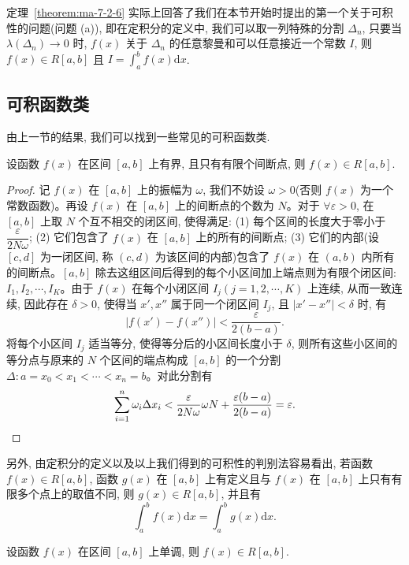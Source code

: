 \begin{remark}\label{remark:ma-7-source-23}
定理~\ref{theorem:ma-7-2-6} 实际上回答了我们在本节开始时提出的第一个关于可积性的问题(问题 (a)), 即在定积分的定义中, 我们可以取一列特殊的分割 $\Delta_n$, 只要当 $\lambda(\Delta_n)\to0$ 时, $f(x)$ 关于 $\Delta_n$ 的任意黎曼和可以任意接近一个常数 $I$, 则 $f(x)\in R[a,b]$ 且 $I=\int_a^b f(x)\mathrm dx$.
\end{remark}


\subsection{可积函数类}
\label{subsec:ma-7-2-3}

由上一节的结果, 我们可以找到一些常见的可积函数类.

\begin{theorem}\label{theorem:ma-7-2-7}
设函数 $f(x)$ 在区间 $[a,b]$ 上有界, 且只有有限个间断点, 则 $f(x)\in R[a,b]$.
\end{theorem}


\begin{proof}
记 $f(x)$ 在 $[a,b]$ 上的振幅为 $\omega$, 我们不妨设 $\omega>0$(否则 $f(x)$ 为一个常数函数)。再设 $f(x)$ 在 $[a,b]$ 上的间断点的个数为 $N$。对于 $\forall\varepsilon>0$, 在 $[a,b]$ 上取 $N$ 个互不相交的闭区间, 使得满足: (1) 每个区间的长度大于零小于 $\dfrac{\varepsilon}{2N\omega}$; (2) 它们包含了 $f(x)$ 在 $[a,b]$ 上的所有的间断点; (3) 它们的内部(设 $[c,d]$ 为一闭区间, 称 $(c,d)$ 为该区间的内部)包含了 $f(x)$ 在 $(a,b)$ 内所有的间断点。$[a,b]$ 除去这组区间后得到的每个小区间加上端点则为有限个闭区间: $I_1,I_2,\cdots,I_K$。由于 $f(x)$ 在每个小闭区间 $I_j(j=1,2,\cdots,K)$ 上连续, 从而一致连续, 因此存在 $\delta>0$, 使得当 $x',x''$ 属于同一个闭区间 $I_j$, 且 $|x'-x''|<\delta$ 时, 有
\[
  |f(x')-f(x'')|<\frac{\varepsilon}{2(b-a)}.
\]
将每个小区间 $I_j$ 适当等分, 使得等分后的小区间长度小于 $\delta$, 则所有这些小区间的等分点与原来的 $N$ 个区间的端点构成 $[a,b]$ 的一个分割 $\Delta:a=x_0<x_1<\cdots<x_n=b$。对此分割有
\[
  \sum_{i=1}^n\omega_i\Delta x_i< \frac{\varepsilon}{2N\omega}\omega N+\frac{\varepsilon(b-a)}{2(b-a)}=\varepsilon.
\qedhere
\]
\end{proof}


另外, 由定积分的定义以及以上我们得到的可积性的判别法容易看出, 若函数 $f(x)\in R[a,b]$, 函数 $g(x)$ 在 $[a,b]$ 上有定义且与 $f(x)$ 在 $[a,b]$ 上只有有限多个点上的取值不同, 则 $g(x)\in R[a,b]$, 并且有
\[
  \int_a^b f(x)\mathrm dx=\int_a^b g(x)\mathrm dx.
\]

\begin{theorem}\label{theorem:ma-7-2-8}
设函数 $f(x)$ 在区间 $[a,b]$ 上单调, 则 $f(x)\in R[a,b]$.
\end{theorem}


